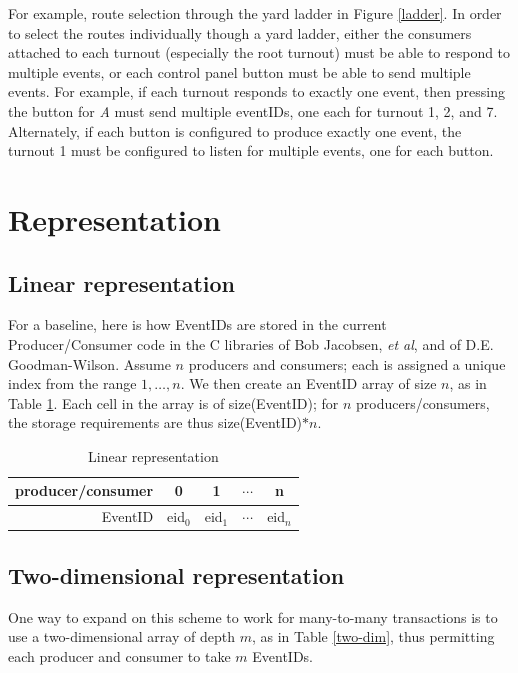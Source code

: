 \documentclass[11pt]{article}
\begin{document}
For example, route selection through the yard ladder in Figure \ref{ladder}. In order to select the routes individually though a yard ladder, either the consumers attached to each turnout (especially the root turnout) must be able to respond to multiple events, or each control panel button must be able to send multiple events. For example, if each turnout responds to exactly one event, then pressing the button for \textit{A} must send multiple eventIDs, one each for turnout 1, 2, and 7. Alternately, if each button is configured to produce exactly one event, the turnout 1 must be configured to listen for multiple events, one for each button.

\section{Representation}

\subsection{Linear representation}

For a baseline, here is how EventIDs are stored in the current Producer/Consumer code in the C libraries of Bob Jacobsen, \textit{et al}, and of D.E. Goodman-Wilson. Assume $n$ producers and consumers; each is assigned a unique index from the range ${1,\ldots,n}$. We then create an EventID array of size $n$, as in Table \ref{linear}. Each cell in the array is of size(EventID); for $n$ producers/consumers, the storage requirements are thus size(EventID)$*n$.
\begin{table}[htdp]
\caption{Linear representation}
\begin{center}
\begin{tabular}{r|c|c|c|c|}
producer/consumer&0&1&$\cdots$&n \\ \hline
EventID&eid$_0$ & eid$_1$ & $\cdots$ &eid$_{n}$\\
\end{tabular}
\end{center}
\label{linear}
\end{table}%

\subsection{Two-dimensional representation}

One way to expand on this scheme to work for many-to-many transactions is to use a two-dimensional array of depth $m$, as in Table \ref{two-dim}, thus permitting each producer and consumer to take $m$ EventIDs.
\end{document}

